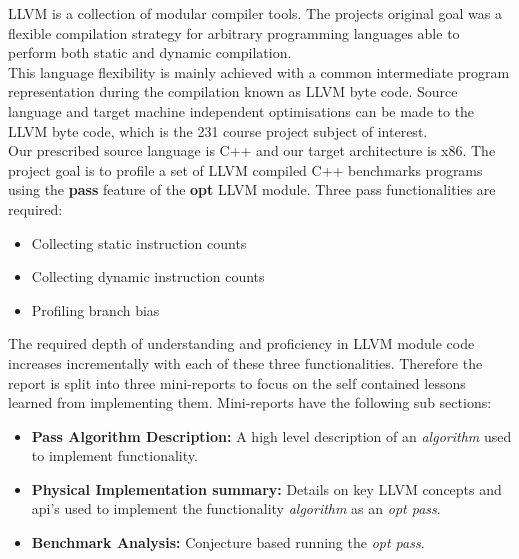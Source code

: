 LLVM is a collection of modular compiler tools. The projects original goal was a flexible compilation strategy for arbitrary programming languages able to perform both static and dynamic compilation.\\
This language flexibility is mainly achieved with a common intermediate program representation during the compilation known as LLVM byte code. Source language and target machine independent optimisations can be made to the LLVM byte code, which is the 231 course project subject of interest.\\
Our prescribed source language is C++ and our target architecture is x86. The project goal is to profile a set of LLVM compiled C++ benchmarks programs using the \textbf{pass} feature of the \textbf{opt} LLVM module.
Three pass functionalities are required:
\begin{itemize}
\item{Collecting static instruction counts}
\item{Collecting dynamic instruction counts}
\item{Profiling branch bias }
\end{itemize}
The required depth of understanding and proficiency in LLVM module code increases incrementally with each of these three functionalities. Therefore the report is split into three mini-reports to focus on the self contained lessons learned from implementing them. Mini-reports have the following sub sections:\\
\begin{itemize}
\item{\textbf{Pass Algorithm Description: }A high level description of an \textit{algorithm} used to implement functionality.}
\item{\textbf{Physical Implementation summary: }Details on key LLVM concepts and api's used to implement the functionality \textit{algorithm} as an \textit{opt pass}.}
\item{\textbf{Benchmark Analysis: }Conjecture based running the \textit{opt pass}.}
\end{itemize}
